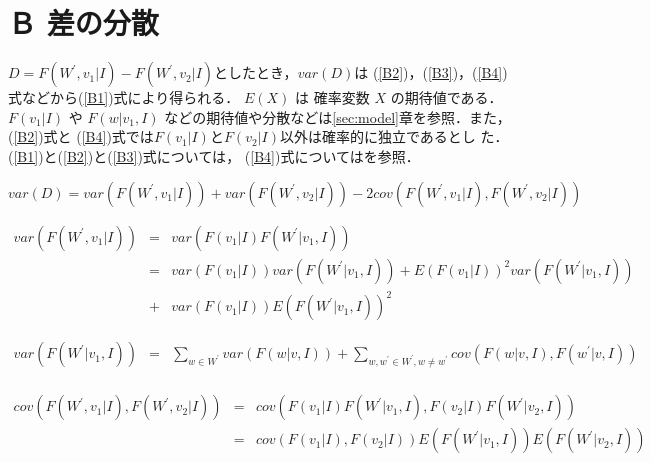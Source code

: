 \section*{Ｂ 差の分散}

$D = F(W^\prime,v_1 | I) - F(W^\prime,v_2 | I)$としたとき，$var(D)$は
(\ref{B2})，(\ref{B3})，(\ref{B4})式などから(\ref{B1})式により得られる．
$E(X)$ は 確率変数 $X$ の期待値である．$F(v_1 | I)$ や $F(w | v_1,I)$ 
などの期待値や分散などは\ref{sec:model}章を参照．また，(\ref{B2})式と
(\ref{B4})式では$F(v_1 | I)$と$F(v_2 | I)$以外は確率的に独立であるとし
た．(\ref{B1})と(\ref{B2})と(\ref{B3})式については\cite{Stuart87}，
(\ref{B4})式については\cite{Bohrnstedt69}を参照．

\begin{equation}
  \label{B1}
  var(D) = var(F(W^\prime,v_1|I)) + var(F(W^\prime,v_2|I)) - 2 cov(F(W^\prime,v_1|I),F(W^\prime,v_2|I))
\end{equation}

\begin{eqnarray}
  \label{B2}
  var(F(W^\prime,v_1 | I)) & = & var(F(v_1 | I) F(W^\prime | v_1,I)) \nonumber \\
  & = & var(F(v_1 | I)) var(F(W^\prime | v_1,I)) 
        + E(F(v_1 | I))^2  var(F(W^\prime | v_1,I)) \nonumber \\
  & + & var(F(v_1 | I)) E(F(W^\prime | v_1,I))^2 
\end{eqnarray}

\begin{eqnarray}
  \label{B3}
  var(F(W^\prime|v_1,I)) & = & \sum_{w \in W^\prime} var(F(w|v,I)) + \sum_{w,w^\prime \in W^\prime, w \ne w^\prime} cov(F(w|v,I),F(w^\prime | v,I)) \nonumber \\
\end{eqnarray}

\begin{eqnarray}
  \label{B4}
  cov(F(W^\prime,v_1 | I),F(W^\prime,v_2 | I)) & = & cov(F(v_1 | I) F(W^\prime | v_1, I),F(v_2 | I) F(W^\prime|v_2,I)) \nonumber \\
  & = & cov(F(v_1 | I),F(v_2 | I)) E(F(W^\prime|v_1,I)) E(F(W^\prime|v_2,I)) \nonumber \\
\end{eqnarray}


